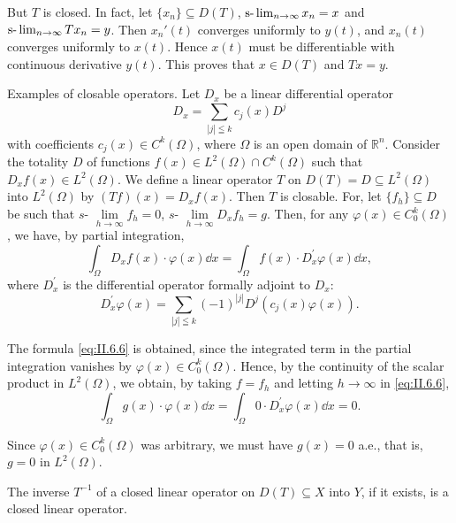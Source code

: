 But $T$ is closed. In fact, let $\{x_n\} \subseteq D(T)$, $\text{s-}\lim\nolimits_{n \to \infty} x_n = x$ and $\text{s-}\lim\nolimits_{n \to \infty} Tx_n = y$. Then $x_n'(t)$ converges uniformly to $y(t)$, and $x_n(t)$ converges uniformly to $x(t)$. Hence $x(t)$ must be differentiable with continuous derivative $y(t)$. This proves that $x \in D(T)$ and $Tx = y$. 

Examples of closable operators. Let $D_{x}$ be a linear differential operator 
\begin{equation}\label{eq:II.6.5}
D _{x} = \sum\limits_{| j | \leqq k} c _{j} (x) D ^{j}
\end{equation}
with coefficients $c_{j}(x) \in C^{k}(\Omega)$, where $\Omega$ is an open domain of $\mathbb{R}^{n}$. Consider the totality $D$ of functions $f(x) \in L^{2}(\Omega) \cap C^{k}(\Omega)$ such that $D_{x}f(x) \in L^{2}(\Omega)$. We define a linear operator $T$ on $D(T) = D \subseteq L^{2}(\Omega)$ into $L^{2}(\Omega)$ by $(Tf)(x) = D_{x}f(x)$. Then $T$ is closable. For, let $\{f_{h}\} \subseteq D$ be such that $s\text{- }\lim\limits_{h \to \infty} f_{h} = 0$, $s\text{- }\lim\limits_{h \to \infty} D_{x}f_{h} = g$. Then, for any $\varphi(x) \in C_{0}^{k}(\Omega)$, we have, by partial integration, 
\begin{equation}\label{eq:II.6.6}
\int_{\Omega} D _{x} f (x) \cdot \varphi (x) \dd x = \int_{\Omega} f (x) \cdot D _{x} ^{\prime} \varphi (x) \dd x,
\end{equation}
where $D_{x}^{\prime}$ is the differential operator formally adjoint to $D_{x}$: 
\begin{equation}\label{eq:II.6.7}
D _{x} ^{\prime} \varphi (x) = \sum\limits_{| j | \leqq k} (- 1) ^{|j|} D ^{j} \left(c _{j} (x) \varphi (x)\right).
\end{equation}

The formula \eqref{eq:II.6.6} is obtained, since the integrated term in the partial integration vanishes by $\varphi(x) \in C_0^k(\Omega)$. Hence, by the continuity of the scalar product in $L^2(\Omega)$, we obtain, by taking $f = f_h$ and letting $h \to \infty$ in \eqref{eq:II.6.6}, 
\begin{equation}\label{eq:II.6.8}
\int_{\Omega} g (x) \cdot \varphi (x) \dd x = \int_{\Omega} 0 \cdot D _{x} ^{\prime} \varphi (x) \dd x = 0.
\end{equation}

Since $\varphi(x) \in C_0^k(\Omega)$ was arbitrary, we must have $g(x) = 0$ a.e., that is, $g = 0$ in $L^2(\Omega)$. 

\begin{proposition}\label{prop:II.6.Proposition.3} The inverse $T^{-1}$ of a closed linear operator on $D(T) \subseteq X$ into $Y$, if it exists, is a closed linear operator. 
\end{proposition}


